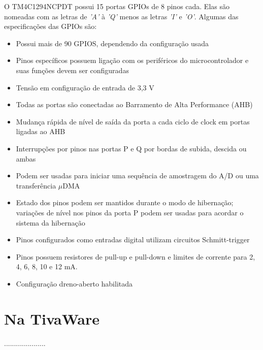 O TM4C1294NCPDT possui 15 portas GPIOs de 8 pinos cada. Elas são nomeadas com as letras de \emph{'A'} à \emph{'Q'} menos as letras \emph{'I'} e \emph{'O'}. Algumas das especificações das GPIOs são:

\begin{itemize}
	\item Possui mais de 90 GPIOS, dependendo da configuração usada
	\item Pinos específicos possuem ligação com os periféricos do microcontrolador e suas funções devem ser configuradas
	\item Tensão em configuração de entrada de 3,3 V
	\item Todas as portas são conectadas ao Barramento de Alta Performance (AHB)
	\item Mudança rápida de nível de saída da porta a cada ciclo de clock em portas ligadas ao AHB
	\item Interrupções por pinos nas portas P e Q por bordas de subida, descida ou ambas
	\item Podem ser usadas para iniciar uma sequência de amostragem do A/D ou uma transferência $\mu$DMA
	\item Estado dos pinos podem ser mantidos durante o modo de hibernação; variações de nível nos pinos da porta P podem ser usadas para acordar o sistema da hibernação
	\item Pinos configurados como entradas digital utilizam circuitos Schmitt-trigger
	\item Pinos possuem resistores de pull-up e pull-down e limites de corrente para 2, 4, 6, 8, 10 e 12 mA.
	\item Configuração dreno-aberto habilitada
\end{itemize}

\section{Na TivaWare}

.....................
\\\\\\\\\\\\\\\\\